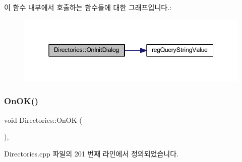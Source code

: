 이 함수 내부에서 호출하는 함수들에 대한 그래프입니다.\+:
\nopagebreak
\begin{figure}[H]
\begin{center}
\leavevmode
\includegraphics[width=345pt]{class_directories_a53964c598a5541b1d65cfee62e5d8587_cgraph}
\end{center}
\end{figure}
\mbox{\label{class_directories_aabe175a096e8718818d7bca6bd6cd455}} 
\subsubsection{\texorpdfstring{On\+O\+K()}{OnOK()}}
{\footnotesize\ttfamily void Directories\+::\+On\+OK (\begin{DoxyParamCaption}{ }\end{DoxyParamCaption})\hspace{0.3cm}{\ttfamily [protected]}, {\ttfamily [virtual]}}



Directories.\+cpp 파일의 201 번째 라인에서 정의되었습니다.


